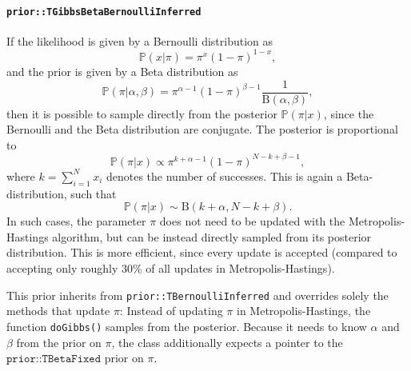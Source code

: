 \documentclass[a4paper,11pt]{article}
\def\Beta{\mbox{B}}
\def\p{\mathbb{P}}
\newcommand{\class}[1]{\texttt{#1}}
\newcommand{\pubfunc}[1]{\texttt{#1()}}
\begin{document}
\paragraph{\class{prior::TGibbsBetaBernoulliInferred}}
If the likelihood is given by a Bernoulli distribution as
\begin{equation*}
   \p(x|\pi) = \pi^x (1-\pi)^{1-x},
\end{equation*}
and the prior is given by a Beta distribution as
\begin{equation*}
   \p(\pi|\alpha, \beta) = \pi^{\alpha-1}(1-\pi)^{\beta-1}\frac{1}{\Beta(\alpha, \beta)},
\end{equation*}
then it is possible to sample directly from the posterior $\p(\pi|x)$, since the Bernoulli and the Beta distribution are conjugate. The posterior is proportional to
\begin{equation*}
   \p(\pi|x) \propto \pi^{ k + \alpha - 1}(1-\pi)^{N - k + \beta - 1},
\end{equation*}
where $k = \sum_{i=1}^N x_i$ denotes the number of successes. This is again a Beta-distribution, such that
\begin{equation*}
   \p(\pi|x) \sim \Beta(k + \alpha, N - k + \beta).
\end{equation*}
In such cases, the parameter $\pi$ does not need to be updated with the Metropolis-Hastings algorithm, but can be instead directly sampled from its posterior distribution. This is more efficient, since every update is accepted (compared to accepting only roughly $30\%$ of all updates in Metropolis-Hastings).

This prior inherits from \class{prior::TBernoulliInferred} and overrides solely the methods that update $\pi$: Instead of updating $\pi$ in Metropolis-Hastings, the function \pubfunc{doGibbs} samples from the posterior. Because it needs to know $\alpha$ and $\beta$ from the prior on $\pi$, the class additionally expects a pointer to the $\class{prior::TBetaFixed}$ prior on $\pi$.
\end{document}
